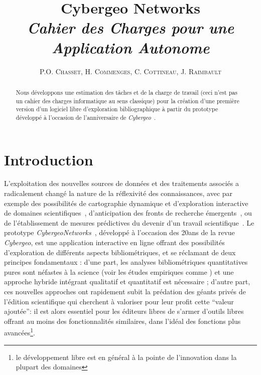 \documentclass[11pt]{article}
\newcommand{\noun}[1]{\textsc{#1}}
\begin{document}
\title{Cybergeo Networks\bigskip\\
\textit{Cahier des Charges pour une Application Autonome}
}

\author{\noun{P.O. Chasset}, \noun{H. Commenges}, \noun{C. Cottineau}, \noun{J. Raimbault}}
\date{}


\maketitle

\justify


\begin{abstract}
Nous développons une estimation des tâches et de la charge de travail (ceci n'est pas un cahier des charges informatique au sens classique) pour la création d'une première version  d'un logiciel libre d'exploration bibliographique à partir du prototype développé à l'occasion de l'anniversaire de \emph{Cybergeo}~\cite{cybergeo20}.
\end{abstract}


\section{Introduction}

L'exploitation des nouvelles sources de données et des traitements associés a radicalement changé la nature de la réflexivité des connaissances, avec par exemple des possibilités de cartographie dynamique \cite{chavalarias2013phylomemetic} et d'exploration interactive de domaines scientifiques~\cite{chen2010citespace}, d'anticipation des fronts de recherche émergents~\cite{shibata2008detecting}, ou de l'établissement de mesures prédictives du devenir d'un travail scientifique~\cite{2013arXiv1310.8220N,2014arXiv1402.7268S}. Le prototype \emph{CybergeoNetworks}~\cite{cybergeo20}, développé à l'occasion des 20ans de la revue \emph{Cybergeo}, est une application interactive en ligne offrant des possibilités d'exploration de différents aspects bibliométriques, et se réclamant de deux principes fondamentaux : d'une part, les analyses bibliométriques quantitatives pures sont néfastes à la science (voir les études empiriques comme \cite{alberto2015they}) et une approche hybride intégrant qualitatif et quantitatif est nécessaire ; d'autre part, ces nouvelles approches ont rapidement subit la prédation des géants privés de l'édition scientifique qui cherchent à valoriser pour leur profit cette ``valeur ajoutée'': il est alors essentiel pour les éditeurs libres de s'armer d'outils libres offrant au moins des fonctionnalités similaires, dans l'idéal des fonctions plus avancées\footnote{le développement libre est en général à la pointe de l'innovation dans la plupart des domaines}.
\end{document}
